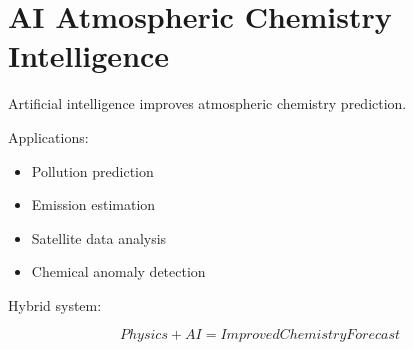 \section{AI Atmospheric Chemistry Intelligence}


Artificial intelligence improves atmospheric chemistry
prediction.



Applications:


\begin{itemize}

\item Pollution prediction

\item Emission estimation

\item Satellite data analysis

\item Chemical anomaly detection

\end{itemize}



Hybrid system:


\[
Physics + AI = Improved Chemistry Forecast
\]
